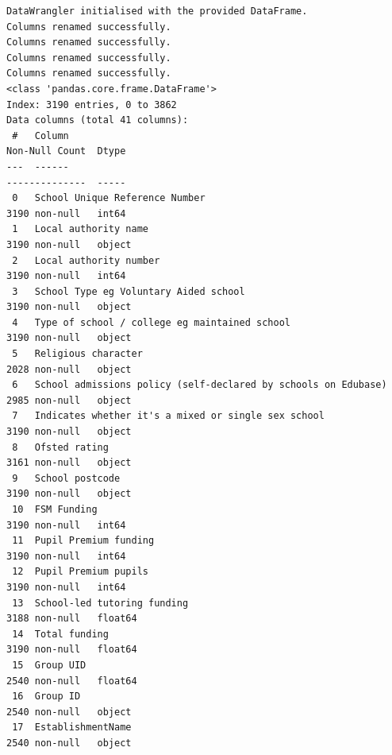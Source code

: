 \documentclass[
  letterpaper,
  DIV=11,
  numbers=noendperiod]{scrartcl}
\begin{document}
\begin{verbatim}
DataWrangler initialised with the provided DataFrame.
Columns renamed successfully.
Columns renamed successfully.
Columns renamed successfully.
Columns renamed successfully.
<class 'pandas.core.frame.DataFrame'>
Index: 3190 entries, 0 to 3862
Data columns (total 41 columns):
 #   Column                                                                               Non-Null Count  Dtype  
---  ------                                                                               --------------  -----  
 0   School Unique Reference Number                                                       3190 non-null   int64  
 1   Local authority name                                                                 3190 non-null   object 
 2   Local authority number                                                               3190 non-null   int64  
 3   School Type eg Voluntary Aided school                                                3190 non-null   object 
 4   Type of school / college eg maintained school                                        3190 non-null   object 
 5   Religious character                                                                  2028 non-null   object 
 6   School admissions policy (self-declared by schools on Edubase)                       2985 non-null   object 
 7   Indicates whether it's a mixed or single sex school                                  3190 non-null   object 
 8   Ofsted rating                                                                        3161 non-null   object 
 9   School postcode                                                                      3190 non-null   object 
 10  FSM Funding                                                                          3190 non-null   int64  
 11  Pupil Premium funding                                                                3190 non-null   int64  
 12  Pupil Premium pupils                                                                 3190 non-null   int64  
 13  School-led tutoring funding                                                          3188 non-null   float64
 14  Total funding                                                                        3190 non-null   float64
 15  Group UID                                                                            2540 non-null   float64
 16  Group ID                                                                             2540 non-null   object 
 17  EstablishmentName                                                                    2540 non-null   object 

\end{verbatim}
\end{document}
